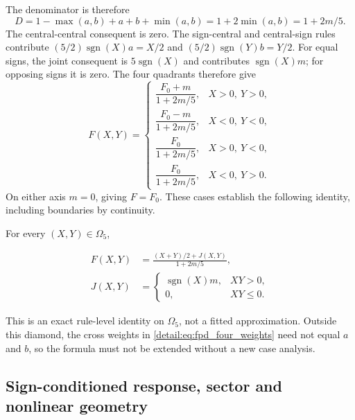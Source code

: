The denominator is therefore
\begin{equation}
 D=1-\max(a,b)+a+b+\min(a,b)
  =1+2\min(a,b)=1+2m/5.
 \label{detail:eq:fpd_denominator}
\end{equation}
The central-central consequent is zero. The sign-central and
central-sign rules contribute $(5/2)\operatorname{sgn}(X)a=X/2$
and $(5/2)\operatorname{sgn}(Y)b=Y/2$.
For equal signs, the joint consequent is
$5\operatorname{sgn}(X)$ and contributes $\operatorname{sgn}(X)m$;
for opposing signs it is zero. The four quadrants therefore give
\begin{equation}
 F(X,Y)=\begin{cases}
 \dfrac{F_0+m}{1+2m/5},&X>0,\ Y>0,\\[4pt]
 \dfrac{F_0-m}{1+2m/5},&X<0,\ Y<0,\\[4pt]
 \dfrac{F_0}{1+2m/5},&X>0,\ Y<0,\\[4pt]
 \dfrac{F_0}{1+2m/5},&X<0,\ Y>0.
 \end{cases}
 \label{detail:eq:fpi_quadrants}
\end{equation}
On either axis $m=0$, giving $F=F_0$. These cases establish the following
identity, including boundaries by continuity.
\begin{btdproposition}
\label{detail:prop:fpi_central}
For every $(X,Y)\in\Omega_5$,

\begin{equation}
 \begin{aligned}
 F(X,Y)&=\frac{(X+Y)/2+J(X,Y)}{1+2m/5},\\
 J(X,Y)&=\begin{cases}\operatorname{sgn}(X)m,&XY>0,\\0,&XY\le0.
 \end{cases}
 \end{aligned}
 \label{detail:eq:fpi_central}
\end{equation}
\end{btdproposition}
This is an exact rule-level identity on $\Omega_5$, not a fitted
approximation. Outside this diamond, the cross weights in
\eqref{detail:eq:fpd_four_weights} need not equal $a$ and $b$, so the formula
must not be extended without a new case analysis.

\subsection{Sign-conditioned response, sector and nonlinear geometry}

